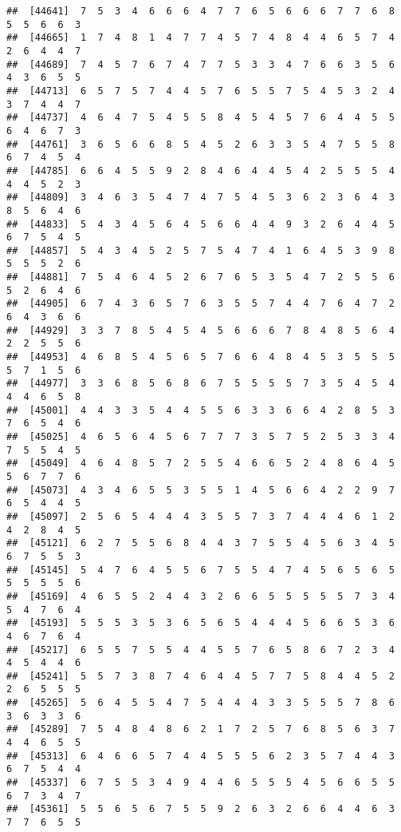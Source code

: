 \documentclass[
]{book}
\begin{document}
\begin{verbatim}
##  [44641]  7  5  3  4  6  6  6  4  7  7  6  5  6  6  6  7  7  6  8  5  5  6  6  3
##  [44665]  1  7  4  8  1  4  7  7  4  5  7  4  8  4  4  6  5  7  4  2  6  4  4  7
##  [44689]  7  4  5  7  6  7  4  7  7  5  3  3  4  7  6  6  3  5  6  4  3  6  5  5
##  [44713]  6  5  7  5  7  4  4  5  7  6  5  5  7  5  4  5  3  2  4  3  7  4  4  7
##  [44737]  4  6  4  7  5  4  5  5  8  4  5  4  5  7  6  4  4  5  5  6  4  6  7  3
##  [44761]  3  6  5  6  6  8  5  4  5  2  6  3  3  5  4  7  5  5  8  6  7  4  5  4
##  [44785]  6  6  4  5  5  9  2  8  4  6  4  4  5  4  2  5  5  5  4  4  4  5  2  3
##  [44809]  3  4  6  3  5  4  7  4  7  5  4  5  3  6  2  3  6  4  3  8  5  6  4  6
##  [44833]  5  4  3  4  5  6  4  5  6  6  4  4  9  3  2  6  4  4  5  6  7  5  4  5
##  [44857]  5  4  3  4  5  2  5  7  5  4  7  4  1  6  4  5  3  9  8  5  5  5  2  6
##  [44881]  7  5  4  6  4  5  2  6  7  6  5  3  5  4  7  2  5  5  6  5  2  6  4  6
##  [44905]  6  7  4  3  6  5  7  6  3  5  5  7  4  4  7  6  4  7  2  6  4  3  6  6
##  [44929]  3  3  7  8  5  4  5  4  5  6  6  6  7  8  4  8  5  6  4  2  2  5  5  6
##  [44953]  4  6  8  5  4  5  6  5  7  6  6  4  8  4  5  3  5  5  5  5  7  1  5  6
##  [44977]  3  3  6  8  5  6  8  6  7  5  5  5  5  7  3  5  4  5  4  4  4  6  5  8
##  [45001]  4  4  3  3  5  4  4  5  5  6  3  3  6  6  4  2  8  5  3  7  6  5  4  6
##  [45025]  4  6  5  6  4  5  6  7  7  7  3  5  7  5  2  5  3  3  4  7  5  5  4  5
##  [45049]  4  6  4  8  5  7  2  5  5  4  6  6  5  2  4  8  6  4  5  5  6  7  7  6
##  [45073]  4  3  4  6  5  5  3  5  5  1  4  5  6  6  4  2  2  9  7  6  5  4  4  5
##  [45097]  2  5  6  5  4  4  4  3  5  5  7  3  7  4  4  4  6  1  2  4  2  8  4  5
##  [45121]  6  2  7  5  5  6  8  4  4  3  7  5  5  4  5  6  3  4  5  6  7  5  5  3
##  [45145]  5  4  7  6  4  5  5  6  7  5  5  4  7  4  5  6  5  6  5  5  5  5  5  6
##  [45169]  4  6  5  5  2  4  4  3  2  6  6  5  5  5  5  5  7  3  4  5  4  7  6  4
##  [45193]  5  5  5  3  5  3  6  5  6  5  4  4  4  5  6  6  5  3  6  4  6  7  6  4
##  [45217]  6  5  5  7  5  5  4  4  5  5  7  6  5  8  6  7  2  3  4  4  5  4  4  6
##  [45241]  5  5  7  3  8  7  4  6  4  4  5  7  7  5  8  4  4  5  2  2  6  5  5  5
##  [45265]  5  6  4  5  5  4  7  5  4  4  4  3  3  5  5  5  7  8  6  3  6  3  3  6
##  [45289]  7  5  4  8  4  8  6  2  1  7  2  5  7  6  8  5  6  3  7  4  4  6  5  5
##  [45313]  6  4  6  6  5  7  4  4  5  5  5  6  2  3  5  7  4  4  3  6  7  5  4  4
##  [45337]  6  7  5  5  3  4  9  4  4  6  5  5  5  4  5  6  6  5  5  6  7  3  4  7
##  [45361]  5  5  6  5  6  7  5  5  9  2  6  3  2  6  6  4  4  6  3  7  7  6  5  5

\end{verbatim}
\end{document}
